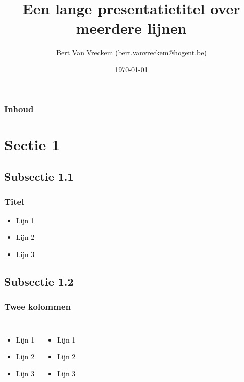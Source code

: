 \documentclass{beamer}
\title[Korte titel]{Een lange presentatietitel over meerdere lijnen}
\author{Bert {Van Vreckem} \small(\href{mailto:bert.vanvreckem@hogent.be}{bert.vanvreckem@hogent.be})}
\date{\today}
\begin{document}

\HoGentLogo

\begin{frame}[plain]
  \titlepage
\end{frame}

\begin{frame}
  \frametitle{Inhoud}

  \tableofcontents
\end{frame}


\section{Sectie 1}

\subsection{Subsectie 1.1}

\begin{frame}
  \frametitle{Titel}

  \begin{itemize}
  \item Lijn 1
  \item Lijn 2
  \item Lijn 3
  \end{itemize}
\end{frame}

\subsection{Subsectie 1.2}

\begin{frame}
  \frametitle{Twee kolommen}

  \begin{columns}[c]

    \begin{itemize}
    \item Lijn 1
    \item Lijn 2
    \item Lijn 3
    \end{itemize}

    \begin{itemize}
    \item Lijn 1
    \item Lijn 2
    \item Lijn 3
    \end{itemize}

  \end{columns}
\end{frame}
\end{document}

